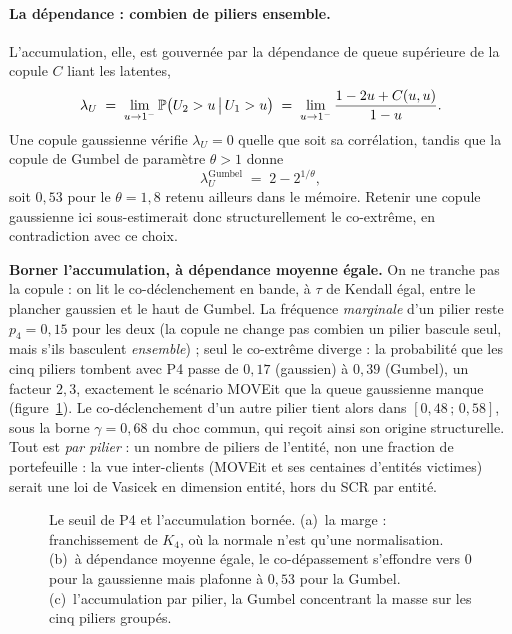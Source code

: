 \paragraph{La dépendance : combien de piliers ensemble.} L'accumulation, elle, est gouvernée par
la dépendance de queue supérieure de la copule $C$ liant les latentes,
\begin{equation}
  \lambda_U \;=\; \lim_{u\to 1^-}\mathbb{P}\bigl(U_2>u \,\big|\, U_1>u\bigr)
             \;=\; \lim_{u\to 1^-}\frac{1-2u+C(u,u)}{1-u} .
  \label{eq:lambda-U}
\end{equation}
Une copule gaussienne vérifie $\lambda_U=0$ quelle que soit sa corrélation, tandis que la copule
de Gumbel de paramètre $\theta>1$ donne
\begin{equation}
  \lambda_U^{\text{Gumbel}} \;=\; 2-2^{1/\theta},
  \label{eq:lambda-gumbel}
\end{equation}
soit $0{,}53$ pour le $\theta=1{,}8$ retenu ailleurs dans le mémoire. Retenir une copule
gaussienne ici sous-estimerait donc structurellement le co-extrême, en contradiction avec ce
choix.

\begin{attention}
\textbf{Borner l'accumulation, à dépendance moyenne égale.} On ne tranche pas la copule : on
lit le co-déclenchement en bande, à $\tau$ de Kendall égal, entre le plancher gaussien
et le haut de Gumbel. La fréquence \emph{marginale} d'un pilier reste $p_4=0{,}15$ pour les deux
(la copule ne change pas combien un pilier bascule seul, mais s'ils basculent \emph{ensemble}) ;
seul le co-extrême diverge : la probabilité que les cinq piliers tombent avec P4 passe
de $0{,}17$ (gaussien) à $0{,}39$ (Gumbel), un facteur $2{,}3$, exactement le scénario MOVEit
que la queue gaussienne manque (figure~\ref{fig:p4-seuil}). Le co-déclenchement d'un autre
pilier tient alors dans $[0{,}48\,;\,0{,}58]$, sous la borne $\gamma=0{,}68$ du choc commun, qui
reçoit ainsi son origine structurelle. Tout est \emph{par pilier} : un nombre de piliers de
l'entité, non une fraction de portefeuille : la vue inter-clients (MOVEit et ses centaines
d'entités victimes) serait une loi de Vasicek en dimension entité, hors du SCR par entité.
\end{attention}

\begin{figure}[htbp]\centering
{}
\caption{Le seuil de P4 et l'accumulation bornée. (a)~la marge : franchissement de $K_4$, où la
normale n'est qu'une normalisation. (b)~à dépendance moyenne égale, le co-dépassement s'effondre
vers $0$ pour la gaussienne mais plafonne à $0{,}53$ pour la Gumbel. (c)~l'accumulation par
pilier, la Gumbel concentrant la masse sur les cinq piliers groupés.}
\label{fig:p4-seuil}
\end{figure}

